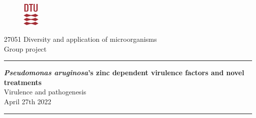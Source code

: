 \begin{titlepage}
    \begin{center}
    
        \begin{figure}
            \includegraphics[width=0.07\textwidth, right]{Figures/DTU.png}
        \end{figure}
    
        \Large
        27051 Diversity and application of microorganisms\\
        
        Group project
        
        \vspace{0.5 cm}
        
        \LARGE
        \rule{\textwidth}{1pt} 
        
        \textbf{\textit{Pseudomonas aruginosa}'s zinc dependent virulence factors and novel treatments}\\
        
        \Large Virulence and pathogenesis\\
        \normalsize April 27th 2022
        \rule{\textwidth}{1pt} 
    
        \vspace{0.5 cm}
        

\end{center}
\end{titlepage}
